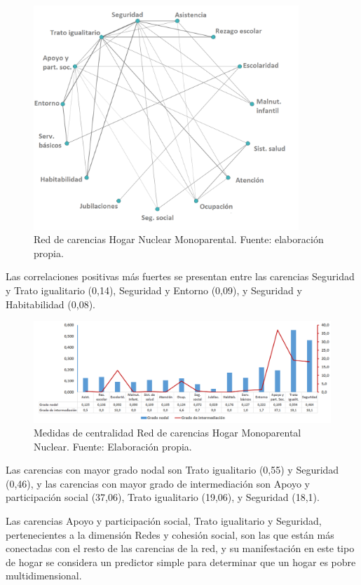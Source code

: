 \documentclass[12pt,letterpaper,spanish]{article}
\begin{document}
\begin{figure}[H]
  \centering

    \includegraphics[width=10cm]{Grafos/grafo_mononuc_pos.png}
    \caption{Red de carencias Hogar Nuclear Monoparental. Fuente: elaboración propia.}
    \label{RedMononucpos}

\end{figure}

Las correlaciones positivas más fuertes se presentan entre las carencias Seguridad y Trato igualitario (0,14), Seguridad y Entorno (0,09), y Seguridad y Habitabilidad (0,08). 

\begin{figure}[H]
    \centering
    \includegraphics[width=\textwidth]{Grafos/nc_mononuc.png}
    \caption{Medidas de centralidad Red de carencias Hogar Monoparental Nuclear. Fuente: Elaboración propia.}
    \label{CenMononuc}
\end{figure}
Las carencias con mayor grado nodal son Trato igualitario (0,55) y Seguridad (0,46), y las carencias con mayor grado de intermediación son Apoyo y participación social (37,06), Trato igualitario (19,06), y Seguridad (18,1).

Las carencias Apoyo y participación social, Trato igualitario y Seguridad, pertenecientes a la dimensión Redes y cohesión social, son las que están más conectadas con el resto de las carencias de la red, y su manifestación en este tipo de hogar se considera un predictor simple para determinar que un hogar es pobre multidimensional.  
\end{document}
